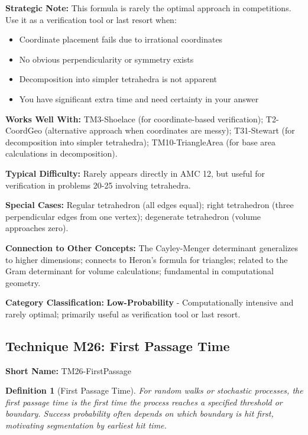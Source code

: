 \documentclass[12pt]{article}
\newtheorem{definition}{Definition}[section]
\begin{document}
\textbf{Strategic Note:} This formula is rarely the optimal approach in competitions. Use it as a verification tool or last resort when:
\begin{itemize}
    \item Coordinate placement fails due to irrational coordinates
    \item No obvious perpendicularity or symmetry exists
    \item Decomposition into simpler tetrahedra is not apparent
    \item You have significant extra time and need certainty in your answer
\end{itemize}

\textbf{Works Well With:} TM3-Shoelace (for coordinate-based verification); T2-CoordGeo (alternative approach when coordinates are messy); T31-Stewart (for decomposition into simpler tetrahedra); TM10-TriangleArea (for base area calculations in decomposition).

\textbf{Typical Difficulty:} Rarely appears directly in AMC 12, but useful for verification in problems 20-25 involving tetrahedra.

\textbf{Special Cases:} Regular tetrahedron (all edges equal); right tetrahedron (three perpendicular edges from one vertex); degenerate tetrahedron (volume approaches zero).

\textbf{Connection to Other Concepts:} The Cayley-Menger determinant generalizes to higher dimensions; connects to Heron's formula for triangles; related to the Gram determinant for volume calculations; fundamental in computational geometry.

\textbf{Category Classification:} \textbf{Low-Probability} - Computationally intensive and rarely optimal; primarily useful as verification tool or last resort.

\subsection{Technique M26: First Passage Time}
\textbf{Short Name:} TM26-FirstPassage

\begin{definition}[First Passage Time]
For random walks or stochastic processes, the first passage time is the first time the process reaches a specified threshold or boundary. Success probability often depends on which boundary is hit first, motivating segmentation by earliest hit time.
\end{definition}
\end{document}
